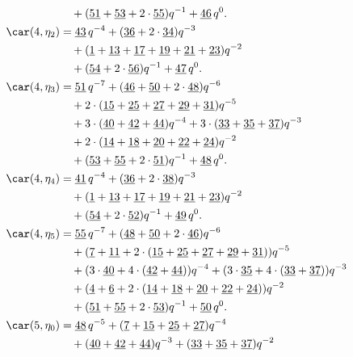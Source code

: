 \begin{align*}
	&\quad+(\underline{51}+\underline{53}+2\cdot\underline{55})q^{-1}+\underline{46}\,q^0.\\
	\car(4,\eta_{2})
	&=\underline{43}\,q^{-4}+(\underline{36}+2\cdot\underline{34})q^{-3}\\
	&\quad+(\underline{1}+\underline{13}+\underline{17}+\underline{19}+\underline{21}+\underline{23})q^{-2}\\
	&\quad+(\underline{54}+2\cdot\underline{56})q^{-1}+\underline{47}\,q^0.\\
	\car(4,\eta_{3})
	&=\underline{51}\,q^{-7}+(\underline{46}+\underline{50}+2\cdot\underline{48})q^{-6}\\
	&\quad+2\cdot(\underline{15}+\underline{25}+\underline{27}+\underline{29}+\underline{31})q^{-5}\\
	&\quad+3\cdot(\underline{40}+\underline{42}+\underline{44})q^{-4}+3\cdot(\underline{33}+\underline{35}+\underline{37})q^{-3}\\
	&\quad+2\cdot(\underline{14}+\underline{18}+\underline{20}+\underline{22}+\underline{24})q^{-2}\\
	&\quad+(\underline{53}+\underline{55}+2\cdot\underline{51})q^{-1}+\underline{48}\,q^0.\\
	\car(4,\eta_{4})
	&=\underline{41}\,q^{-4}+(\underline{36}+2\cdot\underline{38})q^{-3}\\
	&\quad+(\underline{1}+\underline{13}+\underline{17}+\underline{19}+\underline{21}+\underline{23})q^{-2}\\
	&\quad+(\underline{54}+2\cdot\underline{52})q^{-1}+\underline{49}\,q^0.\\
	\car(4,\eta_{5})
	&=\underline{55}\,q^{-7}+(\underline{48}+\underline{50}+2\cdot\underline{46})q^{-6}\\
	&\quad+(\underline{7}+\underline{11}+2\cdot(\underline{15}+\underline{25}+\underline{27}+\underline{29}+\underline{31}))q^{-5}\\
	&\quad+(3\cdot\underline{40}+4\cdot(\underline{42}+\underline{44}))q^{-4}+(3\cdot\underline{35}+4\cdot(\underline{33}+\underline{37}))q^{-3}\\
	&\quad+(\underline{4}+\underline{6}+2\cdot(\underline{14}+\underline{18}+\underline{20}+\underline{22}+\underline{24}))q^{-2}\\
	&\quad+(\underline{51}+\underline{55}+2\cdot\underline{53})q^{-1}+\underline{50}\,q^0.\\
	\car(5,\eta_{0})
	&=\underline{48}\,q^{-5}+(\underline{7}+\underline{15}+\underline{25}+\underline{27})q^{-4}\\
	&\quad+(\underline{40}+\underline{42}+\underline{44})q^{-3}+(\underline{33}+\underline{35}+\underline{37})q^{-2}\\

\end{align*}
